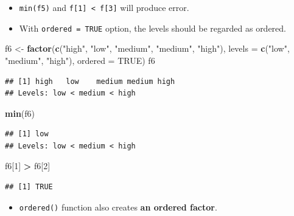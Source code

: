 \documentclass[]{book}
\newenvironment{Shaded}{\begin{snugshade}}{\end{snugshade}}
\newcommand{\DataTypeTok}[1]{\textcolor[rgb]{0.13,0.29,0.53}{#1}}
\newcommand{\DecValTok}[1]{\textcolor[rgb]{0.00,0.00,0.81}{#1}}
\newcommand{\KeywordTok}[1]{\textcolor[rgb]{0.13,0.29,0.53}{\textbf{#1}}}
\newcommand{\NormalTok}[1]{#1}
\newcommand{\OperatorTok}[1]{\textcolor[rgb]{0.81,0.36,0.00}{\textbf{#1}}}
\newcommand{\OtherTok}[1]{\textcolor[rgb]{0.56,0.35,0.01}{#1}}
\newcommand{\StringTok}[1]{\textcolor[rgb]{0.31,0.60,0.02}{#1}}
\providecommand{\tightlist}{%
  \setlength{\itemsep}{0pt}\setlength{\parskip}{0pt}}
\begin{document}
\begin{itemize}
\item
  \texttt{min(f5)} and \texttt{f{[}1{]}\ \textless{}\ f{[}3{]}} will produce error.
\item
  With \texttt{ordered\ =\ TRUE} option, the levels should be regarded as ordered.
\end{itemize}

\begin{Shaded}
\begin{Highlighting}[]
\NormalTok{f6 <-}\StringTok{ }\KeywordTok{factor}\NormalTok{(}\KeywordTok{c}\NormalTok{(}\StringTok{"high"}\NormalTok{, }\StringTok{"low"}\NormalTok{, }\StringTok{"medium"}\NormalTok{, }\StringTok{"medium"}\NormalTok{, }\StringTok{"high"}\NormalTok{), }\DataTypeTok{levels =} \KeywordTok{c}\NormalTok{(}\StringTok{"low"}\NormalTok{, }\StringTok{"medium"}\NormalTok{, }\StringTok{"high"}\NormalTok{), }\DataTypeTok{ordered =} \OtherTok{TRUE}\NormalTok{)}
\NormalTok{f6}
\end{Highlighting}
\end{Shaded}

\begin{verbatim}
## [1] high   low    medium medium high  
## Levels: low < medium < high
\end{verbatim}

\begin{Shaded}
\begin{Highlighting}[]
\KeywordTok{min}\NormalTok{(f6)}
\end{Highlighting}
\end{Shaded}

\begin{verbatim}
## [1] low
## Levels: low < medium < high
\end{verbatim}

\begin{Shaded}
\begin{Highlighting}[]
\NormalTok{f6[}\DecValTok{1}\NormalTok{] }\OperatorTok{>}\StringTok{ }\NormalTok{f6[}\DecValTok{2}\NormalTok{]}
\end{Highlighting}
\end{Shaded}

\begin{verbatim}
## [1] TRUE
\end{verbatim}

\begin{itemize}
\tightlist
\item
  \texttt{ordered()} function also creates \textbf{an ordered factor}.
\end{itemize}
\end{document}
